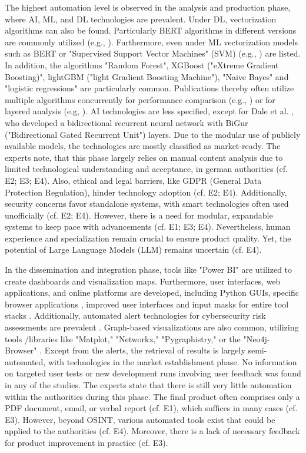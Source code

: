 \documentclass[10pt]{article}
\begin{document}
The highest automation level is observed in the analysis and production phase, where AI, ML, and DL technologies are prevalent.
Under DL, vectorization algorithms can also be found. Particularly BERT algorithms in different versions are commonly utilized
(e.g., \cite{Ma.2022}). Furthermore, even under ML vectorization models such as BERT or
"Supervised Support Vector Machines" (SVM) (e.g., \cite{Iorga.2020}) are listed.
In addition, the algorithms "Random Forest", XGBoost ("eXtreme Gradient Boosting)",
lightGBM ("light Gradient Boosting Machine"), "Naive Bayes" and "logistic regressions" are particularly common.
Publications thereby often utilize multiple algorithms concurrently for performance comparison (e.g., \cite{Tao.2023})
or for layered analysis (e.g, \cite{Yang.2022}). AI technologies are less specified,
except for Dale et al. \cite{Dale.2023}, who developed a bidirectional recurrent neural network with
BiGur ("Bidirectional Gated Recurrent Unit") layers. Due to the modular use of publicly available models,
the technologies are mostly classified as market-ready. The experts note, that this phase largely relies
on manual content analysis due to limited technological understanding and acceptance, in german authorities
(cf. E2; E3; E4). Also, ethical and legal barriers, like GDPR (General Data Protection Regulation), hinder technology
adoption (cf. E2; E4). Additionally, security concerns favor standalone systems,
with smart technologies often used unofficially (cf. E2; E4). However, there is a need for modular,
expandable systems to keep pace with advancements (cf. E1; E3; E4). Nevertheless, human experience
and specialization remain crucial to ensure product quality. Yet, the potential of Large Language Models (LLM) remains uncertain (cf. E4).

In the dissemination and integration phase, tools like "Power BI" \cite{Tao.2023}
are utilized to create dashboards and visualization maps. Furthermore, user interfaces,
web applications, and online platforms are developed, including Python GUIs,
specific browser applications \cite{Elmas.2022},
improved user interfaces and input masks for entire tool stacks \cite{Arjun.2020}.
Additionally, automated alert technologies for cybersecurity risk assessments are prevalent \cite{Ahuja.2022}. Graph-based visualizations are also common, utilizing tools
/libraries like "Matplot," "Networkx," "Pygraphistry," or the "Neo4j-Browser" \cite{Middleton.2020}.
Except from the alerts, the retrieval of results is largely semi-automated, with technologies in the market establishment phase. No information on targeted user tests or new development runs involving user feedback was found in any of the studies. The experts state that there is still very little
automation within the authorities during this phase. The final product often comprises only a PDF document, email, or verbal report (cf. E1), which suffices in many cases (cf. E3).
However, beyond OSINT, various automated tools exist that could be applied to the authorities (cf. E4). Moreover, there is a lack of necessary feedback for product improvement in practice (cf. E3).
\end{document}
